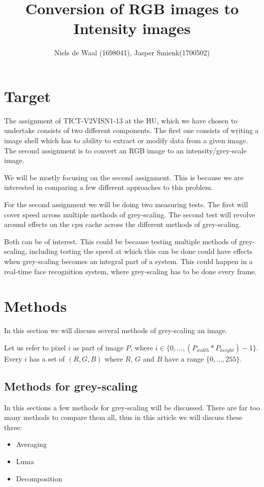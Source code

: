 \documentclass[a4paper]{article}
\begin{document}
\title{Conversion of RGB images to Intensity images}
\author{Niels de Waal (1698041), Jasper Smienk(1700502)}
\maketitle
\newpage

\tableofcontents
\newpage

\section{Target}
The assignment of TICT-V2VISN1-13 at the HU, which we have chosen to undertake consists of two different components.
The first one consists of writing a image shell which has to ability to extract or modify data from a given image.
The second assignment is to convert an RGB image to an intensity/grey-scale image. 

We will be mostly focusing on the second assignment. This is because we are interested in comparing a few different approaches to this problem.

For the second assignment we will be doing two measuring tests. The first will cover speed across multiple methods of grey-scaling. The second test will revolve around effects on the cpu cache across the different methods of grey-scaling.

Both can be of interest. This could be because testing multiple methods of grey-scaling, including testing the speed at which this can be done could have effects when grey-scaling becomes an integral part of a system. This could happen in a real-time face recognition system, where grey-scaling has to be done every frame.

\section{Methods}
In this section we will discuss several methods of grey-scaling an image.

Let us refer to pixel \(i\) as part of image \(P\), where \(i \in \{0, \dotsc , \left( P_{width} * P_{height} \right) - 1 \} \). Every \(i\) has a set of \( \left(R, G, B \right) \) where \(R\), \(G\) and \(B\) have a range \(\{0, \dotsc ,255 \} \).

\subsection{Methods for grey-scaling}
In this sections a few methods for grey-scaling will be discussed.
There are far too many methods to compare them all, thus in this article we will discuss these three:
\begin{itemize}
\item Averaging
\item Luma
\item Decomposition
\end{itemize}
\end{document}
